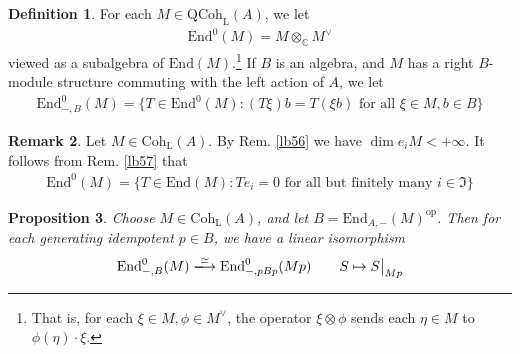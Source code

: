 \documentclass[11pt,b5paper,notitlepage]{article}
\theoremstyle{definition}
\newtheorem{df}{Definition}[section]
\newtheorem{rem}[df]{Remark}
\theoremstyle{plain}
\newtheorem{pp}[df]{Proposition}
\newcommand{\fk}{\mathfrak}
\newcommand{\End}{\mathrm{End}} %
\newcommand{\opp}{\mathrm{op}}
\newcommand{\Cbb}{\mathbb C}
\newcommand{\QC}{\mathrm{QCoh}_{\mathrm L}}
\newcommand{\Coh}{\mathrm{Coh}_{\mathrm L}}
\numberwithin{equation}{section}
\begin{document}
\begin{df}
For each $M\in\QC(A)$, we let
\begin{align*}
\End^0(M)=M\otimes_\Cbb M^\vee
\end{align*}
viewed as a subalgebra of $\End(M)$.\footnote{That is, for each $\xi\in M,\phi\in M^\vee$, the operator $\xi\otimes\phi$ sends each $\eta\in M$ to $\phi(\eta)\cdot\xi$.} If $B$ is an algebra, and $M$ has a right $B$-module structure commuting with the left action of $A$, we let
\begin{align}
\End^0_{-,B}(M)=\{T\in\End^0(M):(T\xi)b=T(\xi b)\text{ for all }\xi\in M,b\in B\}
\end{align}
\end{df}


\begin{rem}\label{lb58}
Let $M\in\Coh(A)$. By Rem. \ref{lb56} we have $\dim e_iM<+\infty$. It follows from Rem. \ref{lb57} that
\begin{align*}
\End^0(M)=\{T\in\End(M):Te_i=0\text{ for all but finitely many }i\in\fk I\}
\end{align*}
\end{rem}


\begin{pp}\label{lb51}
Choose $M\in \Coh(A)$, and let $B=\End_{A,-}(M)^\opp$. Then for each generating idempotent $p\in B$, we have a linear isomorphism
\begin{gather}\label{eq11}
\begin{gathered}
	\End_{-,B}^0(M)\xlongrightarrow{\simeq} \End_{-,pBp}^0(Mp)\qquad S\mapsto S\big|_{Mp}
\end{gathered}
\end{gather}
\end{pp}
\end{document}
